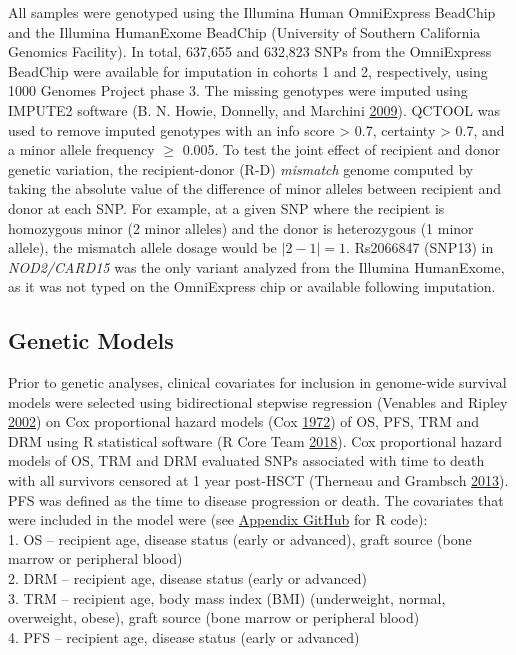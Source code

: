 \documentclass[]{DissertateOSU}
\begin{document}
All samples were genotyped using the Illumina Human OmniExpress BeadChip
and the Illumina HumanExome BeadChip (University of Southern California
Genomics Facility). In total, 637,655 and 632,823 SNPs from the
OmniExpress BeadChip were available for imputation in cohorts 1 and 2,
respectively, using 1000 Genomes Project phase 3. The missing genotypes
were imputed using IMPUTE2 software (B. N. Howie, Donnelly, and Marchini
\protect\hyperlink{ref-Howie_2009}{2009}). QCTOOL was used to remove
imputed genotypes with an info score \textgreater{} 0.7, certainty
\textgreater{} 0.7, and a minor allele frequency \(\geq\) 0.005. To test
the joint effect of recipient and donor genetic variation, the
recipient-donor (R-D) \emph{mismatch} genome computed by taking the
absolute value of the difference of minor alleles between recipient and
donor at each SNP. For example, at a given SNP where the recipient is
homozygous minor (2 minor alleles) and the donor is heterozygous (1
minor allele), the mismatch allele dosage would be \(|2-1|=1\).
Rs2066847 (SNP13) in \emph{NOD2/CARD15} was the only variant analyzed
from the Illumina HumanExome, as it was not typed on the OmniExpress
chip or available following imputation.

\subsection{Genetic Models}\label{genetic-models}

Prior to genetic analyses, clinical covariates for inclusion in
genome-wide survival models were selected using bidirectional stepwise
regression (Venables and Ripley
\protect\hyperlink{ref-Venables_2002}{2002}) on Cox proportional hazard
models (Cox \protect\hyperlink{ref-cox1972}{1972}) of OS, PFS, TRM and
DRM using R statistical software (R Core Team
\protect\hyperlink{ref-r_core}{2018}). Cox proportional hazard models of
OS, TRM and DRM evaluated SNPs associated with time to death with all
survivors censored at 1 year post-HSCT (Therneau and Grambsch
\protect\hyperlink{ref-therneau2013}{2013}). PFS was defined as the time
to disease progression or death. The covariates that were included in
the model were (see
\href{https://github.com/aarizvi/dissertation/tree/master/code/chapter2}{Appendix
GitHub} for R code):\\
1. OS -- recipient age, disease status (early or advanced), graft source
(bone marrow or peripheral blood)\\
2. DRM -- recipient age, disease status (early or advanced)\\
3. TRM -- recipient age, body mass index (BMI) (underweight, normal,
overweight, obese), graft source (bone marrow or peripheral blood)\\
4. PFS -- recipient age, disease status (early or advanced)
\end{document}
